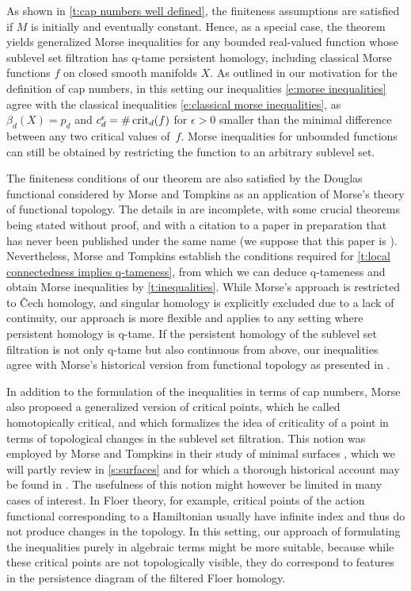 As shown in \cref{t:cap numbers well defined}, the finiteness assumptions are satisfied if $M$ is initially and eventually constant.
Hence, as a special case, the theorem yields generalized Morse inequalities for any bounded real-valued function whose sublevel set filtration has q-tame persistent homology, including classical Morse functions $f$ on closed smooth manifolds $X$.
As outlined in our motivation for the definition of cap numbers, in this setting our inequalities \eqref{e:morse inequalities} agree with the classical inequalities \eqref{e:classical morse inequalities}, as $\beta_d(X) = p_d$ and $c_d^{\epsilon} = \# \operatorname{crit}_d(f)$ for $\epsilon > 0$ smaller than the minimal difference between any two critical values of~$f$.
Morse inequalities for unbounded functions can still be obtained by restricting the function to an arbitrary sublevel set.

The finiteness conditions of our theorem are also satisfied by the Douglas functional considered by Morse and Tompkins as an application of Morse's theory of functional topology.
The details in \cite{Morse.1939} are incomplete, with some crucial theorems being stated without proof, and with a citation to a paper in preparation that has never been published under the same name (we suppose that this paper is \cite{Morse.1940}).
Nevertheless, Morse and Tompkins establish the conditions required for \cref{t:local connectedness implies q-tameness}, from which we can deduce q-tameness and obtain Morse inequalities by \cref{t:inequalities}.
While Morse's approach is restricted to \v{C}ech homology, and singular homology is explicitly excluded due to a lack of continuity, our approach is more flexible and applies to any setting where persistent homology is q-tame.
If the persistent homology of the sublevel set filtration is not only q-tame but also continuous from above, our inequalities agree with Morse's historical version from functional topology as presented in \cite[Corollary~12.3]{Morse.1940}.

\begin{rem} \label{r:homotopically critial points}
	In addition to the formulation of the inequalities in terms of cap numbers, Morse also proposed a generalized version of critical points, which he called homotopically critical, and which formalizes the idea of criticality of a point in terms of topological changes in the sublevel set filtration.
	This notion was employed by Morse and Tompkins in their study of minimal surfaces \cite{Morse.1939}, which we will partly review in \cref{s:surfaces} and for which a thorough historical account may be found in \cite[Section II.6]{Struwe.1988}.
	The usefulness of this notion might however be limited in many cases of interest.
	In Floer theory, for example, critical points of the action functional corresponding to a Hamiltonian usually have infinite index and thus do not produce changes in the topology.
	In this setting, our approach of formulating the inequalities purely in algebraic terms might be more suitable, because while these critical points are not topologically visible, they do correspond to features in the persistence diagram of the filtered Floer homology.
\end{rem}
